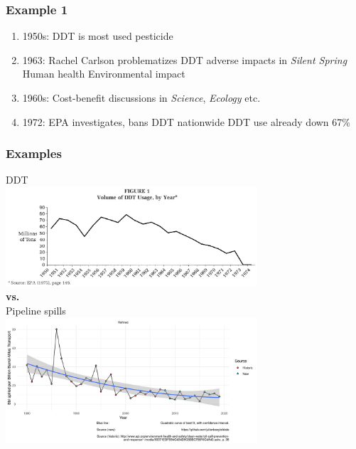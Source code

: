 \begin{frame}
	\frametitle{Example 1}
	\begin{block}{\citet{Maguire2009}}
		\begin{enumerate}
			\item <1-> 1950s: DDT is most used pesticide
			\item <2-> 1963: Rachel Carlson problematizes DDT adverse impacts in \textit{Silent Spring}
				\subitem Human health
				\subitem Environmental impact
			\item <3-> 1960s: Cost-benefit discussions in \textit{Science}, \textit{Ecology} etc.
			\item <4-> 1972: EPA investigates, bans DDT nationwide
				\subitem DDT use already down 67\%
		\end{enumerate}
	\end{block}
\end{frame}

\begin{frame}
	\begin{center}
		\frametitle{Examples}
		DDT\\
		\includegraphics[width=0.7\textwidth]{illustrations/Maguire_Hardy_Fig_1.png}\\
			\textbf{vs.}\\

		Pipeline spills\\	
		\includegraphics[width=0.7\textwidth]{illustrations/pipeline_spill_trend.png}
	\end{center}
\end{frame}

